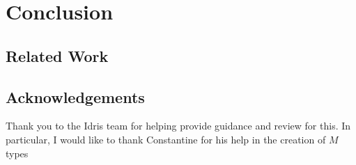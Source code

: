 \section{Conclusion}

\subsection*{Related Work}

\subsection*{Acknowledgements}

Thank you to the Idris team for helping provide guidance and review for this.
In particular, I would like to thank Constantine for his help in the creation of $M$ types